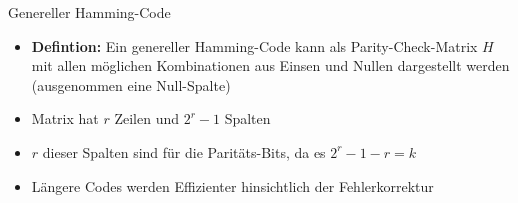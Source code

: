 \documentclass[11pt%
,aspectratio=169%
]{beamer}
\begin{document}
\begin{frame}{Genereller Hamming-Code}
    \begin{itemize}
        \item \textbf{Defintion:} Ein genereller Hamming-Code kann als Parity-Check-Matrix $H$ mit allen möglichen Kombinationen aus Einsen und Nullen dargestellt werden (ausgenommen eine Null-Spalte)
        \item Matrix hat $r$ Zeilen und $2^r - 1$ Spalten 
        \item $r$ dieser Spalten sind für die Paritäts-Bits, da es $2^r - 1 - r = k$

    \end{itemize}
  \begin{itemize}
      \item Längere Codes werden Effizienter hinsichtlich der Fehlerkorrektur 
  \end{itemize}
\end{frame}
\end{document}
